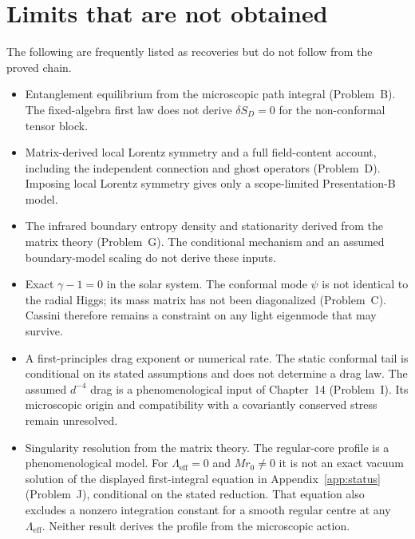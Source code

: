 \section{Limits that are not obtained}
\label{sec:recovery-not}

The following are frequently listed as recoveries but do not follow
from the proved chain.

\begin{itemize}
  \item Entanglement equilibrium from the microscopic path integral
        (Problem~B). The fixed-algebra first law does not derive
        \(\delta S_D=0\) for the non-conformal tensor block.

  \item Matrix-derived local Lorentz symmetry and a full field-content
        account, including the independent connection and ghost
        operators (Problem~D). Imposing local Lorentz symmetry gives
        only a scope-limited Presentation-B model.

  \item The infrared boundary entropy density and stationarity derived
        from the matrix theory (Problem~G). The conditional mechanism
        and an assumed boundary-model scaling do not derive these inputs.

  \item Exact \(\gamma-1=0\) in the solar system.
        The conformal mode \(\psi\) is not identical to the radial
        Higgs; its mass matrix has not been diagonalized
        (Problem~C). Cassini therefore remains a constraint on any
        light eigenmode that may survive.

  \item A first-principles drag exponent or numerical rate.
        The static conformal tail is conditional on its stated
        assumptions and does not determine a drag law. The assumed
        \(d^{-4}\) drag is a phenomenological input of Chapter~14
        (Problem~I). Its microscopic origin and compatibility with a
        covariantly conserved stress remain unresolved.

  \item Singularity resolution from the matrix theory.
        The regular-core profile is a phenomenological model. For
        \(\Lambda_{\mathrm{eff}}=0\) and \(Mr_0\ne0\) it is not an
        exact vacuum solution of the displayed first-integral equation
        in Appendix~\ref{app:status} (Problem~J), conditional on the
        stated reduction. That equation also excludes a nonzero
        integration constant for a smooth regular centre at any
        \(\Lambda_{\mathrm{eff}}\). Neither result derives the profile
        from the microscopic action.


\end{itemize}
